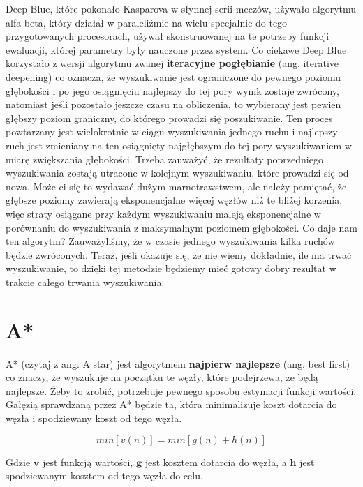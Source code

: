 Deep Blue, które pokonało Kasparova w słynnej serii meczów, używało algorytmu alfa-beta, który działał w paraleliźmie na wielu specjalnie do tego przygotowanych procesorach, używał skonstruowanej na te potrzeby funkcji ewaluacji, której parametry były nauczone przez system. Co ciekawe Deep Blue korzystało z wersji algorytmu zwanej \textbf{iteracyjne pogłębianie} (ang. iterative deepening) co oznacza, że wyszukiwanie jest ograniczone do pewnego poziomu głębokości i po jego osiągnięciu najlepszy do tej pory wynik zostaje zwrócony, natomiast jeśli pozostało jeszcze czasu na obliczenia, to wybierany jest pewien głębszy poziom graniczny, do którego prowadzi się poszukiwanie. Ten proces powtarzany jest wielokrotnie w ciągu wyszukiwania jednego ruchu i najlepszy ruch jest zmieniany na ten osiągnięty najgłębszym do tej pory wyszukiwaniem w miarę zwiększania głębokości. Trzeba zauważyć, że rezultaty poprzedniego wyszukiwania zostają utracone w kolejnym wyszukiwaniu, które prowadzi się od nowa. Może ci się to wydawać dużym marnotrawstwem, ale należy pamiętać, że głębsze poziomy zawierają eksponencjalne więcej węzłów niż te bliżej korzenia, więc straty osiągane przy każdym wyszukiwaniu maleją eksponencjalne w porównaniu do wyszukiwania z maksymalnym poziomem głębokości. Co daje nam ten algorytm? Zauważyliśmy, że w czasie jednego wyszukiwania kilka ruchów będzie zwróconych. Teraz, jeśli okazuje się, że nie wiemy dokładnie, ile ma trwać wyszukiwanie, to dzięki tej metodzie będziemy mieć gotowy dobry rezultat w trakcie całego trwania wyszukiwania.



\section{A*}

A* (czytaj z ang. A star) jest algorytmem \textbf{najpierw najlepsze} (ang. best first) co znaczy, że wyszukuje na początku te węzły, które podejrzewa, że będą najlepsze. Żeby to zrobić, potrzebuje pewnego sposobu estymacji funkcji wartości. Gałęzią sprawdzaną przez A* będzie ta, która minimalizuje koszt dotarcia do węzła i spodziewany koszt od tego węzła.

\begin{equation}
min[v(n)] = min[g(n) + h(n)]
\end{equation}

Gdzie $\boldsymbol{v}$ jest funkcją wartości, $\boldsymbol{g}$ jest kosztem dotarcia do węzła, a $\boldsymbol{h}$ jest spodziewanym kosztem od tego węzła do celu.\newline

